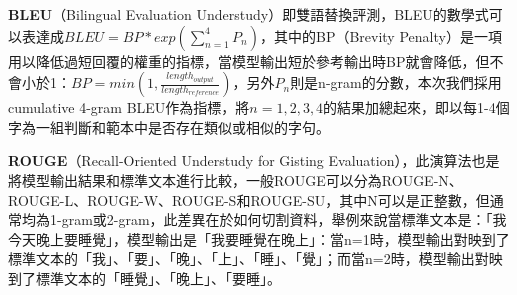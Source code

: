 \documentclass[12pt,a4paper,MingLiU,UTF8,natbib]{article}
\begin{document}
	\hspace*{0.1cm}%
	\begin{minipage}{.9\textwidth}%
		\textbf{BLEU}（Bilingual Evaluation Understudy）即雙語替換評測，BLEU的數學式可以表達成$BLEU=BP*exp(\sum_{n=1}^{4}P_n)$，其中的BP（Brevity Penalty）是一項用以降低過短回覆的權重的指標，當模型輸出短於參考輸出時BP就會降低，但不會小於1：$BP=min(1,\frac{length_{output}}{length_{reference}})$，另外$P_n$則是n-gram的分數，本次我們採用cumulative 4-gram BLEU作為指標，將$n=1,2,3,4$的結果加總起來，即以每1-4個字為一組判斷和範本中是否存在類似或相似的字句。\cite{papineni2002bleu}

		\textbf{ROUGE}（Recall-Oriented Understudy for Gisting Evaluation），此演算法也是將模型輸出結果和標準文本進行比較，一般ROUGE可以分為ROUGE-N、ROUGE-L、ROUGE-W、ROUGE-S和ROUGE-SU\cite{Lin2004LookingFA}，其中N可以是正整數，但通常均為1-gram或2-gram，此差異在於如何切割資料，舉例來說當標準文本是：「我今天晚上要睡覺」，模型輸出是「我要睡覺在晚上」：當n=1時，模型輸出對映到了標準文本的「我」、「要」、「晚」、「上」、「睡」、「覺」；而當n=2時，模型輸出對映到了標準文本的「睡覺」、「晚上」、「要睡」。


\end{minipage}
\end{document}
